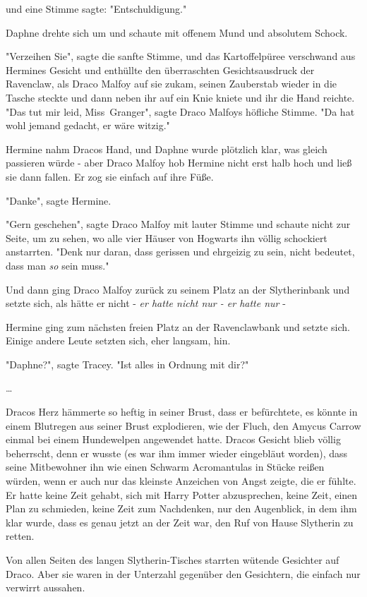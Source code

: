 {und eine Stimme sagte: "Entschuldigung."

Daphne drehte sich um und schaute mit offenem Mund und absolutem Schock.

"Verzeihen Sie", sagte die sanfte Stimme, und das Kartoffelpüree verschwand aus Hermines Gesicht und enthüllte den überraschten Gesichtsausdruck der Ravenclaw, als Draco Malfoy auf sie zukam, seinen Zauberstab wieder in die Tasche steckte und dann neben ihr auf ein Knie kniete und ihr die Hand reichte. "Das tut mir leid, Miss~Granger", sagte Draco Malfoys höfliche Stimme. "Da hat wohl jemand gedacht, er wäre witzig."

Hermine nahm Dracos Hand, und Daphne wurde plötzlich klar, was gleich passieren würde - aber Draco Malfoy hob Hermine nicht erst halb hoch und ließ sie dann fallen. Er zog sie einfach auf ihre Füße.

"Danke", sagte Hermine.

"Gern geschehen", sagte Draco Malfoy mit lauter Stimme und schaute nicht zur Seite, um zu sehen, wo alle vier Häuser von Hogwarts ihn völlig schockiert anstarrten. "Denk nur daran, dass gerissen und ehrgeizig zu sein, nicht bedeutet, dass man \emph{so} sein muss."

Und dann ging Draco Malfoy zurück zu seinem Platz an der Slytherinbank und setzte sich, als hätte er nicht - \emph{er hatte nicht nur - er hatte nur} -

Hermine ging zum nächsten freien Platz an der Ravenclawbank und setzte sich. Einige andere Leute setzten sich, eher langsam, hin.

"Daphne?", sagte Tracey. "Ist alles in Ordnung mit dir?"

…

Dracos Herz hämmerte so heftig in seiner Brust, dass er befürchtete, es könnte in einem Blutregen aus seiner Brust explodieren, wie der Fluch, den Amycus Carrow einmal bei einem Hundewelpen angewendet hatte. Dracos Gesicht blieb völlig beherrscht, denn er wusste (es war ihm immer wieder eingebläut worden), dass seine Mitbewohner ihn wie einen Schwarm Acromantulas in Stücke reißen würden, wenn er auch nur das kleinste Anzeichen von Angst zeigte, die er fühlte. Er hatte keine Zeit gehabt, sich mit Harry Potter abzusprechen, keine Zeit, einen Plan zu schmieden, keine Zeit zum Nachdenken, nur den Augenblick, in dem ihm klar wurde, dass es genau jetzt an der Zeit war, den Ruf von Hause Slytherin zu retten.

Von allen Seiten des langen Slytherin-Tisches starrten wütende Gesichter auf Draco. Aber sie waren in der Unterzahl gegenüber den Gesichtern, die einfach nur verwirrt aussahen.

}
